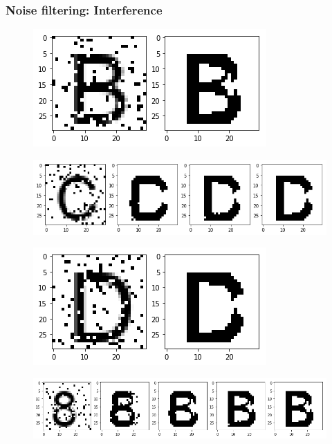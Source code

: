 \documentclass{beamer}
\begin{document}
\begin{frame}
\frametitle{Noise filtering: Interference}
\begin{figure}
\includegraphics[height=0.15\textheight]{./images02/filter/case2-b-10noise.png}
\end{figure}
\begin{figure}
\includegraphics[height=0.15\textheight]{./images02/filter/case2-c-10noise.png}
\end{figure}
\begin{figure}
\includegraphics[height=0.15\textheight]{./images02/filter/case2-d-10noise.png}
\end{figure}
\begin{figure}
\includegraphics[height=0.15\textheight]{./images02/filter/case2-8-10noise.png}
\end{figure}
\end{frame}
\end{document}
